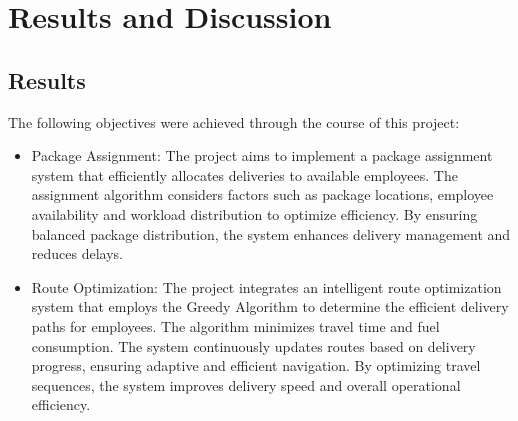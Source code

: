 \chapter{Results and Discussion}
\label{Results}
\section{Results}
The following objectives were achieved through the course of this project:
\begin{itemize}
    \item Package Assignment: The project aims to implement a package assignment system that efficiently allocates deliveries to available employees. The assignment algorithm considers factors such as package locations, employee availability and workload distribution to optimize efficiency. By ensuring balanced package distribution, the system enhances delivery management and reduces delays.
    \item Route Optimization: The project integrates an intelligent route optimization system that employs the Greedy Algorithm to determine the efficient delivery paths for employees.  The algorithm minimizes travel time and fuel consumption. The system continuously updates routes based on delivery progress, ensuring adaptive and efficient navigation. By optimizing travel sequences, the system improves delivery speed and overall operational efficiency.
\end{itemize}
